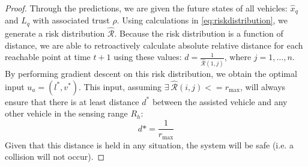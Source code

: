 \documentclass[letterpaper, 10 pt, conference]{ieeeconf}  %
\newcommand\NB[1]{$\spadesuit$\footnote{NB: #1}}
\begin{document}
\begin{proof}
Through the predictions, we are given the future states of all vehicles: $\hat{x}_q$ and $L_q$ with associated trust $\rho$. Using calculations in \eqref{eq:riskdistribution}, we generate a risk distribution $\hat{\mathcal{R}}$. Because the risk distribution is a function of distance, we are able to retroactively calculate absolute relative distance for each reachable point at time $t+1$ using these values: $d = \frac{1}{\hat{\mathcal{R}}(1,j)}$,
where $j = 1,\ldots,n$. By performing gradient descent on this risk distribution, we obtain the optimal input $u_a = (l^*,v^*)$. This input, assuming $\exists~\hat{\mathcal{R}}(i,j) <= r_\max$, will always ensure that there is at least distance $d^*$ between the assisted vehicle and any other vehicle in the sensing range $R_h$:\begin{equation}
    d* = \frac{1}{r_\max}
\end{equation}
Given that this distance is held in any situation, the system will be safe (i.e. a collision will not occur).


\end{proof}



\end{document}
